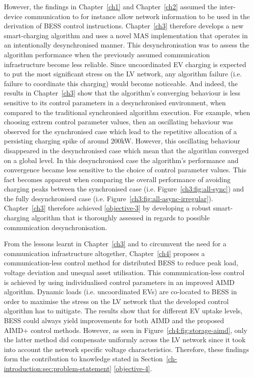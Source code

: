 However, the findings in Chapter~\ref{ch1} and Chapter~\ref{ch2} assumed the inter-device communication to for instance allow network information to be used in the derivation of BESS control instructions.
Chapter~\ref{ch3} therefore develops a new smart-charging algorithm and uses a novel MAS implementation that operates in an intentionally desynchronised manner.
This desynchronisation was to assess the algorithm performance when the previously assumed communication infrastructure become less reliable.
Since uncoordinated EV charging is expected to put the most significant stress on the LV network, any algorithm failure (i.e. failure to coordinate this charging) would become noticeable.
And indeed, the results in Chapter~\ref{ch3} show that the algorithm's converging behaviour is less sensitive to its control parameters in a desynchronised environment, when compared to the traditional synchronised algorithm execution.
For example, when choosing extrem control parameter values, then an oscillating behaviour was observed for the synchronised case which lead to the repetitive allocation of a persisting charging spike of around 200kW.
However, this oscillating behaviour disappeared in the desynchronised case which mean that the algorithm converged on a global level.
In this desynchronised case the algorithm's performance and convergence became less sensitive to the choice of control parameter values.
This fact becomes apparent when comparing the overall performance of avoiding charging peaks between the synchronised case (i.e. Figure~\ref{ch3:fig:all-sync}) and the fully desynchronised case (i.e. Figure~\ref{ch3:fig:all-async-irregular}).
Chapter~\ref{ch3} therefore achieved \ref{objective-3} by developing a robust smart-charging algorithm that is thoroughly assessed in regards to possible communication desynchronisation.

From the lessons learnt in Chapter~\ref{ch3} and to circumvent the need for a communication infrastructure altogether, Chapter~\ref{ch4} proposes a communication-less control method for distributed BESS to reduce peak load, voltage deviation and unequal asset utilisation.
This communication-less control is achieved by using individualised control parameters in an improved AIMD algorithm.
Dynamic loads (i.e. uncoordinated EVs) are co-located to BESS in order to maximise the stress on the LV network that the developed control algorithm has to mitigate.
The results show that for different EV uptake levels, BESS could always yield improvements for both AIMD and the proposed AIMD+ control methods.
However, as seen in Figure~\ref{ch4:fig:storage-aimd}, only the latter method did compensate uniformly across the LV network since it took into account the network specific voltage characteristics.
Therefore, these findings form the contribution to knowledge stated in Section~\ref{ch-introduction:sec:problem-statement} \ref{objective-4}.

